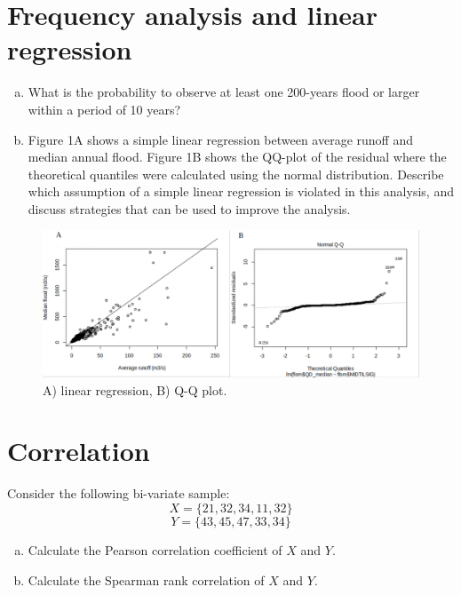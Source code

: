 \documentclass[12pt]{article}
\begin{document}
\section{Frequency analysis and linear regression}
\begin{enumerate}[(a)]
\item What is the probability to observe at least one 200-years flood or larger within a period of 10 years?
\item Figure 1A shows a simple linear regression between average runoff and median annual flood. Figure 1B shows the QQ-plot of the residual where the theoretical quantiles were calculated using the normal distribution. Describe which assumption of a simple linear regression is violated in this analysis, and discuss strategies that can be used to improve the analysis.
\end{enumerate}

\begin{figure}[h!]
    \centering
    \includegraphics[width=.8\textwidth]{fig01} 
    \caption{A) linear regression, B) Q-Q plot.}
\end{figure}




\section{Correlation}
Consider the following bi-variate sample:
$$X=\{21, 32, 34, 11, 32\}$$
$$Y=\{43, 45, 47, 33, 34\}$$
\begin{enumerate}[(a)] 
\item Calculate the Pearson correlation coefficient of $X$ and $Y$.
\item Calculate the Spearman rank correlation of $X$ and $Y$.
 \end{enumerate}
\end{document}
